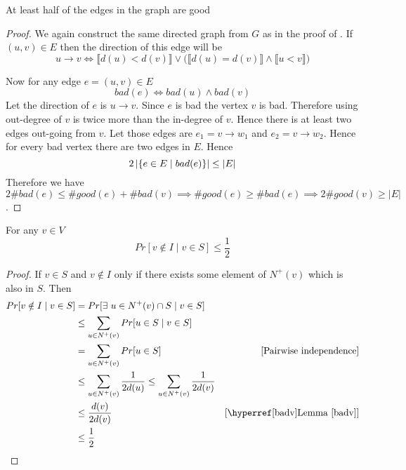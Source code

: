 \begin{lemma}\label{halfgood}
	At least half of the edges in the graph are good
\end{lemma}
\begin{proof}
	We again construct the same directed graph from $G$ as in the proof of . If $(u,v)\in E$ then the direction of this edge will be $$u\to v\iff \llbracket d(u)<d(v)\rrbracket \vee \Big(\llbracket d(u)=d(v)\rrbracket\wedge \llbracket u<v\rrbracket\Big)$$
	
	Now for any edge $e=(u,v)\in E$ $$bad(e)\iff bad(u)\wedge bad(v)$$Let the direction of $e$ is $u\to v$. Since $e$ is bad the vertex $v$ is bad. Therefore using  out-degree of $v$ is twice more than the in-degree of $v$. Hence there is at least two edges out-going from $v$. Let those edges are $e_1=v\to w_1$ and $e_2=v\to w_2$. Hence for every bad vertex there are two edges in $E$. Hence $$2\left|\{ e\in E\mid bad(e)\}\right| \leq |E|$$Therefore we have $2 \#bad(e)\leq \#good(e)+\#bad(v)\implies \#good(e)\geq \#bad(e)\implies 2\#good(v)\geq |E|$.
\end{proof}


\begin{lemma}\label{vinSnotinI}
		For any $v\in V$ $$Pr[v\notin I\mid v\in S]\leq \frac12$$
\end{lemma}
\begin{proof}If $v\in S$ and $v\notin I$ only if there exists some element of $N^+(v)$ which is also in $S$. Then
\begin{align*}
	Pr[v\notin I\mid v\in S] & = Pr[\exs\ u\in N^+(v)\cap S\mid v\in S]                                     &  \\
	                         & \leq \sum_{u\in N^{+}(v)} Pr[u\in S\mid v\in S]                              &  \\
	                         & = \sum_{u\in N^{+}(v)} Pr[u\in S]                                            & [\text{Pairwise independence}] \\
	                         & \leq \sum_{u\in N^+(v)} \frac1{2d(u)}\leq \sum_{u\in N^+(v)} \frac{1}{2d(v)} &  \\
	                         & \leq \frac{d(v)}{2d(v)}                                                      & [\text{\lmref{badv}}]          \\
	                         & \leq \frac12                                                                 &
\end{align*}	
\end{proof}

